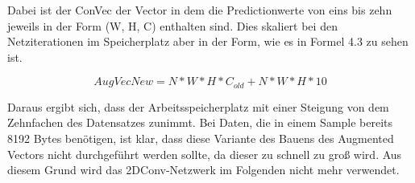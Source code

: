 Dabei ist der ConVec der Vector in dem die Predictionwerte von eins bis zehn jeweils in der Form (W, H, C) enthalten sind. Dies skaliert bei 
den Netziterationen im Speicherplatz aber in der Form, wie es in Formel 4.3 zu sehen ist.  

\begin{equation}
    AugVecNew = N*W*H*C_{old} + N*W*H*10
\end{equation}

Daraus ergibt sich, dass der Arbeitsspeicherplatz mit einer Steigung von dem Zehnfachen des Datensatzes zunimmt. Bei Daten, die in einem Sample 
bereits 8192 Bytes benötigen, ist klar, dass diese Variante des Bauens des Augmented Vectors nicht durchgeführt werden sollte, da dieser zu 
schnell zu groß wird. Aus diesem Grund wird das 2DConv-Netzwerk im Folgenden nicht mehr verwendet. 

